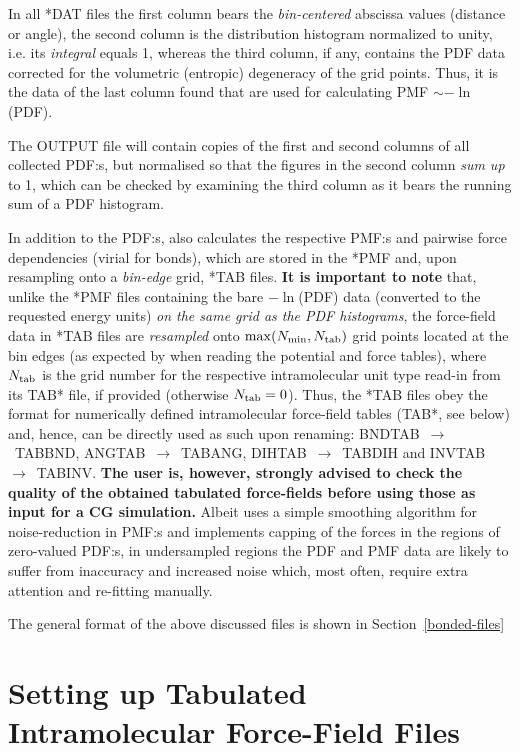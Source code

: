 In all *DAT files the first column bears the {\em bin-centered}
abscissa values (distance or angle), the second column is the distribution
histogram normalized to unity, i.e. its {\em integral} equals 1, whereas
the third column, if any, contains the PDF data corrected for the volumetric
(entropic) degeneracy of the grid points.  Thus, it is the data of the last
column found that are used for calculating PMF $\sim -\ln$(PDF).

The OUTPUT file will contain copies of the first and second
columns of all collected PDF:s, but normalised so that the figures
in the second column {\em sum up} to 1, which can be checked
by examining the third column as it bears the running sum of
a PDF histogram.

In addition to the PDF:s, \D also calculates the respective PMF:s and
pairwise force dependencies (virial for bonds), which are stored in
the *PMF and, upon resampling onto a {\em bin-edge} grid, *TAB files.
{\bf It is important to note} that, unlike the *PMF files containing
the bare $-\ln$(PDF) data (converted to the requested energy units)
{\em on the same grid as the PDF histograms}, the force-field data in *TAB 
files are {\em resampled} onto $\max(N_{\rm min},N_{\rm tab})$ grid points
located at the bin edges (as expected by \D when reading the potential
and force tables), where $N_{\rm tab}$ is the grid number for
the respective intramolecular unit type read-in from its TAB* file,
if provided (otherwise $N_{\rm tab}=0$). Thus, the *TAB files obey
the \D format for numerically defined intramolecular force-field tables
(TAB*, see below) and, hence, can be directly used as such upon renaming:
BNDTAB~$\to$~TABBND, ANGTAB~$\to$~TABANG, DIHTAB~$\to$~TABDIH and INVTAB~$\to$~TABINV.
{\bf The user is, however, strongly advised to check the quality
of the obtained tabulated force-fields before using those as input
for a CG simulation.}  Albeit \D uses a simple smoothing algorithm
for noise-reduction in PMF:s and implements capping of the forces
in the regions of zero-valued PDF:s, in undersampled regions the PDF
and PMF data are likely to suffer from inaccuracy and increased noise
which, most often, require extra attention and re-fitting manually.

The general format of the above discussed files is shown in Section~\ref{bonded-files}

\section{Setting up Tabulated Intramolecular Force-Field Files}
\label{bonded-tables}

